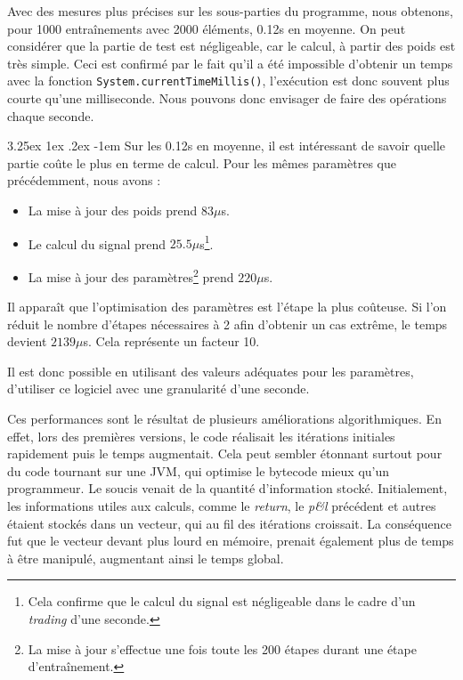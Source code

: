 \documentclass[a4paper, 11pt]{article}
\makeatletter
\renewcommand\paragraph{\@startsection{paragraph}{5}{\z@}%
  {3.25ex \@plus1ex \@minus.2ex}%
  {-1em}%
  {\normalfont\normalsize\bfseries}}
\makeatother
\begin{document}
Avec des mesures plus précises sur les sous-parties du programme, nous obtenons, pour 1000 entraînements avec 2000 éléments, 0.12s en moyenne. On peut considérer que la partie de test est négligeable, car le calcul, à partir des poids est très simple. Ceci est confirmé par le fait qu'il a été impossible d'obtenir un temps avec la fonction \lstinline|System.currentTimeMillis()|, l'exécution est donc souvent plus courte qu'une milliseconde.
Nous pouvons donc envisager de faire des opérations chaque seconde.

\paragraph{}
Sur les 0.12s en moyenne, il est intéressant de savoir quelle partie coûte le plus en terme de calcul.
Pour les mêmes paramètres que précédemment, nous avons :
\begin{itemize}
	\item La mise à jour des poids prend $83\mu$s.
	\item Le calcul du signal prend $25.5\mu$s\footnote{Cela confirme que le calcul du signal est négligeable dans le cadre d'un \textit{trading} d'une seconde.}.
	\item La mise à jour des paramètres\footnote{La mise à jour s'effectue une fois toute les 200 étapes durant une étape d'entraînement.} prend $220\mu$s.
\end{itemize}

Il apparaît que l'optimisation des paramètres est l'étape la plus coûteuse. Si l'on réduit le nombre d'étapes nécessaires à 2 afin d'obtenir un cas extrême, le temps devient $2139\mu$s. Cela représente un facteur 10.

Il est donc possible en utilisant des valeurs adéquates pour les paramètres, d'utiliser ce logiciel avec une granularité d'une seconde.

Ces performances sont le résultat de plusieurs améliorations algorithmiques. En effet, lors des premières versions, le code réalisait les itérations initiales rapidement puis le temps augmentait. Cela peut sembler étonnant surtout pour du code tournant sur une JVM, qui optimise le bytecode mieux qu'un programmeur. Le soucis venait de la quantité d'information stocké. Initialement, les informations utiles aux calculs, comme le \textit{return}, le \textit{p\&l} précédent et autres étaient stockés dans un vecteur, qui au fil des itérations croissait. La conséquence fut que le vecteur devant plus lourd en mémoire, prenait également plus de temps à être manipulé, augmentant ainsi le temps global.
\end{document}

